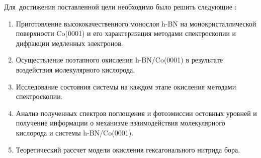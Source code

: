 Для~достижения поставленной цели необходимо было решить следующие {\tasks}:
\begin{enumerate}
  \item Приготовление высококачественного монослоя h-BN на
  монокристаллической поверхности Co(0001) и его характеризация 
  методами спектроскопии и дифракции медленных электронов.
  \item Осуществление поэтапного окисления h-BN/Co(0001) в
  результате воздействия молекулярного кислорода.
  \item Исследование состояния системы на каждом этапе окисления
  методами спектроскопии.
  \item Анализ полученных спектров поглощения и фотоэмиссии 
  остовных уровней и получение информации о механизме 
  взаимодействия молекулярного кислорода и системы h-BN/Co(0001).
  \item Теоретический рассчет модели окисления гексагонального
  нитрида бора.
\end{enumerate}










